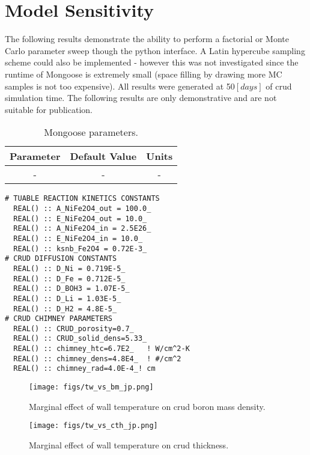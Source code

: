 \documentclass[10pt,a4paper]{report}
\begin{document}
\chapter{Model Sensitivity}

The following results demonstrate the ability to perform a factorial or Monte Carlo parameter sweep though the python interface.  A Latin hypercube sampling scheme could also be implemented - however this was not investigated since the runtime of Mongoose is extremely small (space filling by drawing more MC samples is not too expensive).  All results were generated at 50$[days]$ of crud simulation time.  The following results are only demonstrative and are not suitable for publication.

\begin{table}[h!]
\begin{center}
\begin{tabular}{|c|c|c|}
\hline
 Parameter  &   Default Value	&  Units  \\
 \hline
 -  &   - &  -  \\ \hline
\hline
\end{tabular}
\caption{Mongoose parameters.}
\label{tab:crud_res}
\end{center}
\end{table}

\begin{verbatim}
# TUABLE REACTION KINETICS CONSTANTS
  REAL() :: A_NiFe2O4_out = 100.0_
  REAL() :: E_NiFe2O4_out = 10.0_
  REAL() :: A_NiFe2O4_in = 2.5E26_
  REAL() :: E_NiFe2O4_in = 10.0_
  REAL() :: ksnb_Fe2O4 = 0.72E-3_
# CRUD DIFFUSION CONSTANTS
  REAL() :: D_Ni = 0.719E-5_
  REAL() :: D_Fe = 0.712E-5_
  REAL() :: D_BOH3 = 1.07E-5_
  REAL() :: D_Li = 1.03E-5_
  REAL() :: D_H2 = 4.8E-5_
# CRUD CHIMNEY PARAMETERS
  REAL() :: CRUD_porosity=0.7_
  REAL() :: CRUD_solid_dens=5.33_
  REAL() :: chimney_htc=6.7E2_   ! W/cm^2-K
  REAL() :: chimney_dens=4.8E4_  ! #/cm^2
  REAL() :: chimney_rad=4.0E-4_! cm
\end{verbatim}


\begin{figure}
    \centering
    \begin{minipage}{.5\textwidth}
        \centering
        \texttt{[image: figs/tw\_vs\_bm\_jp.png]}
        \caption{Marginal effect of wall temperature on crud boron mass density.}
    \end{minipage}%
    \begin{minipage}{.5\textwidth}
        \centering
        \texttt{[image: figs/tw\_vs\_cth\_jp.png]}
        \caption{Marginal effect of wall temperature on crud thickness.}
    \end{minipage}
\end{figure}
\end{document}
